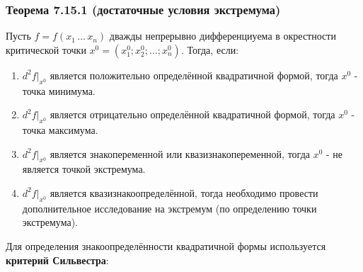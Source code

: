 \documentclass[12pt]{article}
\begin{document}
    \subsubsection*{Теорема 7.15.1 (достаточные условия экстремума)}\label{th:7.15.1}
    Пусть $f = f(x_1\, \dots\, x_n)$ дважды непрерывно дифференциуема в окрестности критической точки $x^0 = (x^0_1; x^0_2; \dots; x^0_n)$. Тогда, если:
    \begin{enumerate}
        \item $d^2f \Big|_{x^0}$ является положительно определённой квадратичной формой, тогда $x^0$ - точка минимума.
        \item $d^2f \Big|_{x^0}$ является отрицательно определённой квадратичной формой, тогда $x^0$ - точка максимума.
        \item $d^2f \Big|_{x^0}$ является знакопеременной или квазизнакопеременной, тогда $x^0$ - не является точкой экстремума.
        \item $d^2f \Big|_{x^0}$ является квазизнакоопределённой, тогда необходимо провести дополнительное исследование на экстремум (по определению точки экстремума).
    \end{enumerate}
    Для определения знакоопределённости квадратичной формы используется \textbf{критерий Сильвестра}:
\end{document}
